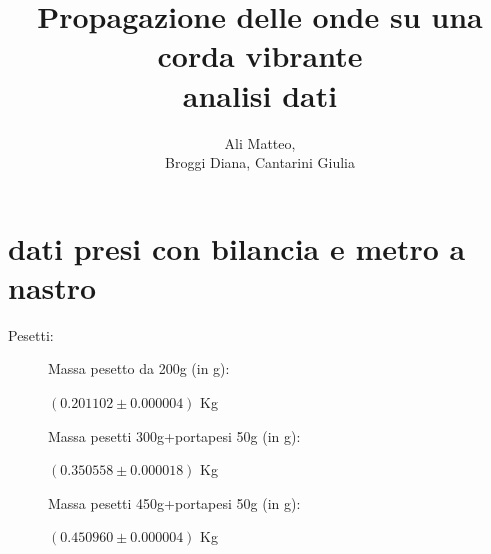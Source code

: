 \documentclass[a4paper]{article}
\title{Propagazione delle onde su una corda vibrante\\ analisi dati}
\author{Ali Matteo,\\Broggi Diana, Cantarini Giulia}
\date{ }
\theoremstyle{definition}
\begin{document}
	\maketitle
\section*{dati presi con bilancia e metro a nastro}
Pesetti:
\begin{figure}[!ht]
	\captionsetup{labelformat=empty}
	\caption{Massa pesetto da 200g (in g):}
\caption{\((0.201102 \pm 0.000004)\) Kg}
\end{figure}

\begin{figure}[!ht]
	\captionsetup{labelformat=empty}
	\caption{Massa pesetti 300g+portapesi 50g (in g):}
\caption{\((0.350558 \pm 0.000018)\) Kg}
\end{figure}

\begin{figure}[!ht]
		\captionsetup{labelformat=empty}
	\caption{Massa pesetti 450g+portapesi 50g (in g):}
\caption{\( (0.450960 \pm 0.000004) \) Kg}
\end{figure}
\end{document}
